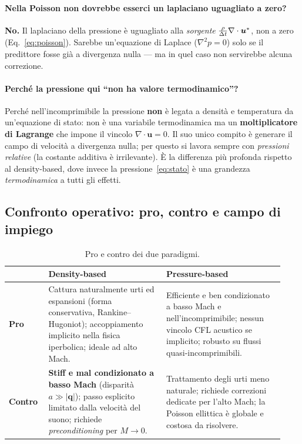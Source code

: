 \paragraph{Nella Poisson non dovrebbe esserci un laplaciano uguagliato a zero?}
\textbf{No.} Il laplaciano della pressione è uguagliato alla \emph{sorgente}
$\tfrac{\rho}{\Delta t}\nabla\cdot\bm u^{*}$, non a zero (Eq.~\ref{eq:poisson}). Sarebbe
un'equazione di Laplace ($\nabla^2 p=0$) solo se il predittore fosse già a divergenza
nulla --- ma in quel caso non servirebbe alcuna correzione.

\paragraph{Perché la pressione qui ``non ha valore termodinamico''?}
Perché nell'incomprimibile la pressione \textbf{non} è legata a densità e temperatura da
un'equazione di stato: non è una variabile termodinamica ma un \textbf{moltiplicatore di
Lagrange} che impone il vincolo $\nabla\cdot\bm u=0$. Il suo unico compito è generare il
campo di velocità a divergenza nulla; per questo si lavora sempre con \emph{pressioni
relative} (la costante additiva è irrilevante). È la differenza più profonda rispetto al
density-based, dove invece la pressione~\eqref{eq:stato} è una grandezza
\emph{termodinamica} a tutti gli effetti.

\subsection{Confronto operativo: pro, contro e campo di impiego}
\label{sub:confronto_paradigmi}

\begin{table}[H]
\centering
\caption{Pro e contro dei due paradigmi.}
\label{tab:paradigmi_procontro}
\renewcommand{\arraystretch}{1.3}
\begin{tabular}{p{0.13\linewidth} p{0.40\linewidth} p{0.40\linewidth}}
\toprule
 & \textbf{Density-based} & \textbf{Pressure-based} \\
\midrule
\textbf{Pro} &
Cattura naturalmente urti ed espansioni (forma conservativa, Rankine--Hugoniot);
accoppiamento implicito nella fisica iperbolica; ideale ad alto Mach. &
Efficiente e ben condizionato a basso Mach e nell'incomprimibile; nessun vincolo CFL
acustico se implicito; robusto su flussi quasi-incomprimibili. \\[3pt]
\textbf{Contro} &
\textbf{Stiff e mal condizionato a basso Mach} (disparità $a\gg|\bm q|$); passo esplicito
limitato dalla velocità del suono; richiede \emph{preconditioning} per $M\to0$. &
Trattamento degli urti meno naturale; richiede correzioni dedicate per l'alto Mach;
la Poisson ellittica è globale e costosa da risolvere. \\
\bottomrule
\end{tabular}
\end{table}

